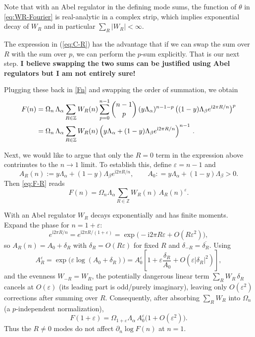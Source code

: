 \documentclass[11pt]{article}
\newcommand{\ii}{\mathrm{i}}
\newcommand{\eps}{\varepsilon}
\begin{document}
{  Note that with an Abel regulator in the defining mode sums, the function of
  $\theta$ in \eqref{eq:WR-Fourier} is real-analytic in a complex strip, which
  implies exponential decay of $W_{R}$ and in particular
  $\sum_{R}|W_{R}|<\infty$.

  The expression in (\ref{eq:C-R}) has the advantage that if we can swap the sum
  over $R$ with the sum over $p$, we can perform the $p$-sum explicitly. That is
  our next step. {\bf I believe swapping the two sums can be justified using Abel regulators but I am not entirely sure!}

  Plugging these back in \ref{Fn} and swapping the order of summation, we obtain
  \begin{align}
    F(n) & =\Omega_{n}\,\Lambda_{\alpha}\sum_{R\in\mathbb{Z}}W_{R}(n) \sum_{p=0}^{n-1}\binom{n-1}{p}\, (y\Lambda_{\alpha})^{n-1-p}\, \bigl((1-y)\Lambda_{\beta}e^{\ii2\pi R/n}\bigr)^{p}\nonumber \\
         & = \Omega_{n}\,\Lambda_{\alpha}\sum_{R\in\mathbb{Z}}W_{R}(n)\, \Bigl(y\Lambda_{\alpha}+(1-y)\Lambda_{\beta}e^{\ii2\pi R/n}\Bigr)^{n-1}\ . \label{eq:F-R}
  \end{align}

  Next, we would like to argue that only the $R=0$ term in the expression above contrinutes
  to the $n\to 1$ limit. To establish this, define $\eps=n-1$ and
  \begin{equation}
    A_{R}(n):=y\Lambda_{\alpha}+(1-y)\Lambda_{\beta}e^{\ii2\pi R/n},\qquad A_{0}:
    =y\Lambda_{\alpha}+(1-y)\Lambda_{\beta}>0.
  \end{equation}
  Then \eqref{eq:F-R} reads
  \begin{equation}
    F(n)=\Omega_{n}\Lambda_{\alpha}\sum_{R\in\mathbb{Z}}W_{R}(n)\,A_{R}(n)^{\eps}
    . \label{eq:F-eps}
  \end{equation}

  With an Abel regulator $W_{R}$ decays exponentially and has finite moments.
  Expand the phase for $n=1+\eps$:
  \begin{equation}
    e^{\ii2\pi R/n}=e^{\ii2\pi R/(1+\eps)}=\exp\!\bigl(-\ii2\pi R\eps+O(R\eps^{2}
    )\bigr),
  \end{equation}
  so $A_{R}(n)=A_{0}+\delta_{R}$ with $\delta_{R}=O(R\eps)$ for fixed $R$ and $\delta
  _{-R}=\overline{\delta_R}$. Using
  \begin{equation}
    A_{R}^{\eps}=\exp\!\bigl(\eps\log(A_{0}+\delta_{R})\bigr)=A_{0}^{\eps}\left[1
    +\eps\frac{\delta_{R}}{A_{0}}+O(\eps|\delta_{R}|^{2})\right],
  \end{equation}
  and the evenness $W_{-R}=W_{R}$, the potentially dangerous linear term $\sum_{R}
  W_{R}\,\delta_{R}$ cancels at $O(\eps)$ (its leading part is odd/purely
  imaginary), leaving only $O(\eps^{2})$ corrections after summing over $R$. Consequently,
  after absorbing $\sum_{R}W_{R}$ into $\Omega_{n}$ (a $p$-independent normalization),
  \begin{equation}
    F(1+\eps)=\Omega_{1+\eps}\Lambda_{\alpha}\,A_{0}^{\eps}\bigl(1+O(\eps^{2})\bigr
    ). \label{eq:F-asymp}
  \end{equation}
  Thus the $R\neq 0$ modes do not affect $\partial_{n}\log F(n)$ at $n=1$.

}
\end{document}

